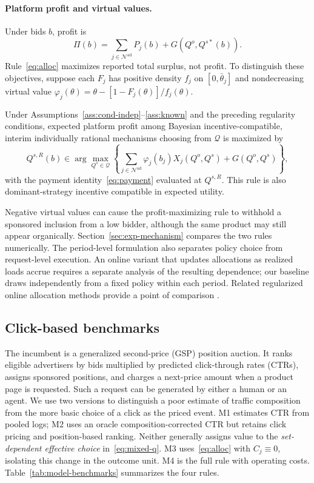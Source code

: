 \documentclass[opre,dblanonrev]{informs4}
\providecommand{\1}{\mathbf{1}}
\begin{document}
\paragraph{Platform profit and virtual values.} Under bids $b$, profit is
\[
\Pi(b)=\sum_{j\in\mathcal N^{\mathrm{ad}}}P_j(b)+G(Q^o,Q^{s\ast}(b)).
\]
Rule~\eqref{eq:alloc} maximizes reported total surplus, not profit. To distinguish these objectives, suppose each $F_j$ has positive density $f_j$ on $[0,\bar\theta_j]$ and nondecreasing virtual value $\varphi_j(\theta)=\theta-[1-F_j(\theta)]/f_j(\theta)$.

\begin{proposition}\label{prop:profit}
Under Assumptions~\ref{ass:cond-indep}--\ref{ass:known} and the preceding regularity conditions, expected platform profit among Bayesian incentive-compatible, interim individually rational mechanisms choosing from $\mathcal Q$ is maximized by
\[
Q^{s,R}(b)\in\arg\max_{Q^s\in\mathcal Q}
\left\{\sum_{j\in\mathcal N^{\mathrm{ad}}}\varphi_j(b_j)X_j(Q^o,Q^s)+G(Q^o,Q^s)\right\},
\]
with the payment identity~\eqref{eq:payment} evaluated at $Q^{s,R}$. This rule is also dominant-strategy incentive compatible in expected utility.
\end{proposition}

Negative virtual values can cause the profit-maximizing rule to withhold a sponsored inclusion from a low bidder, although the same product may still appear organically. Section~\ref{sec:exp-mechanism} compares the two rules numerically. The period-level formulation also separates policy choice from request-level execution. An online variant that updates allocations as realized loads accrue requires a separate analysis of the resulting dependence; our baseline draws independently from a fixed policy within each period. Related regularized online allocation methods provide a point of comparison \citep{balseiro2025regularized}.

\subsection{Click-based benchmarks}\label{sec:model-benchmarks}

The incumbent is a generalized second-price (GSP) position auction. It ranks eligible advertisers by bids multiplied by predicted click-through rates (CTRs), assigns sponsored positions, and charges a next-price amount when a product page is requested. Such a request can be generated by either a human or an agent. We use two versions to distinguish a poor estimate of traffic composition from the more basic choice of a click as the priced event. M1 estimates CTR from pooled logs; M2 uses an oracle composition-corrected CTR but retains click pricing and position-based ranking. Neither generally assigns value to the \emph{set-dependent effective choice} in~\eqref{eq:mixed-q}. M3 uses~\eqref{eq:alloc} with $C_j\equiv0$, isolating this change in the outcome unit. M4 is the full rule with operating costs. Table~\ref{tab:model-benchmarks} summarizes the four rules.
\end{document}
